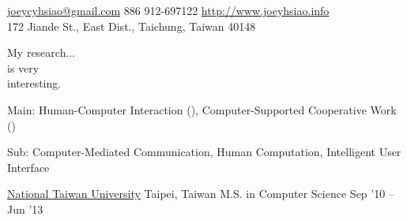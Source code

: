 \documentclass[10pt, a4paper]{article} %
\begin{document}
 



\noindent\href{mailto:joeycyhsiao@gmail.com}{joeycyhsiao@gmail.com}\bull %
\textsmaller{+}886 912-697122\bull %
\href{http://www.joeyhsiao.info}{http://www.joeyhsiao.info}\\ %
172 Jiande St., East Dist., Taichung, Taiwan 40148 

\spacedhrule{1.5em}{-1em} %


My research...\\
is very\\
interesting.

\spacedhrule{1.5em}{-1em} %



Main: Human-Computer Interaction (), Computer-Supported Cooperative Work () 

Sub: Computer-Mediated Communication, Human Computation, Intelligent User Interface

\spacedhrule{1.5em}{-1em} %



\headedsection %
{\href{http://www.ntu.edu.tw}{National Taiwan University}}
{Taipei, Taiwan}
{\headedsubsection %
	{M.S. in Computer Science}
	{Sep '10 -- Jun '13}
	{}
}
\end{document}
